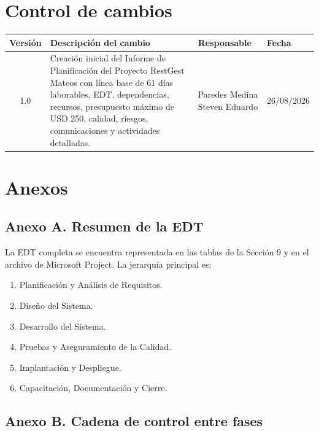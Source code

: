 \documentclass[12pt,a4paper]{article}
\begin{document}
\section{Control de cambios}

\begin{center}
\renewcommand{\arraystretch}{1.25}
\begin{tabularx}{\textwidth}{|c|X|p{4cm}|p{3cm}|}
\hline
\rowcolor{tableheader}
\textbf{Versión} & \textbf{Descripción del cambio} & \textbf{Responsable} & \textbf{Fecha} \\ \hline
1.0 & Creación inicial del Informe de Planificación del Proyecto RestGest Mateos con línea base de 61 días laborables, EDT, dependencias, recursos, presupuesto máximo de USD 250, calidad, riesgos, comunicaciones y actividades detalladas. & Paredes Medina Steven Eduardo & 26/08/2026 \\ \hline
\end{tabularx}
\end{center}

\section{Anexos}

\subsection*{Anexo A. Resumen de la EDT}

La EDT completa se encuentra representada en las tablas de la Sección 9 y en el archivo de Microsoft Project. La jerarquía principal es:

\begin{enumerate}
    \item Planificación y Análisis de Requisitos.
    \item Diseño del Sistema.
    \item Desarrollo del Sistema.
    \item Pruebas y Aseguramiento de la Calidad.
    \item Implantación y Despliegue.
    \item Capacitación, Documentación y Cierre.
\end{enumerate}

\subsection*{Anexo B. Cadena de control entre fases}
\end{document}
